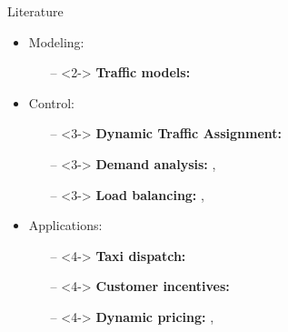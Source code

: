     \begin{frame}{Literature}
    \begin{itemize}
        \item<1->\alert{Modeling:}
            \begin{itemize}
                \item[--]<2-> \textbf{Traffic models:} \textcite{wardrop1900journey,treiber2000congested} \\
            \end{itemize}
        \item<1->\alert{Control:}
            \begin{itemize}
                \item[--]<3-> \textbf{Dynamic Traffic Assignment:} \textcite{friesz1989dynamic,merchant1978optimality,waller2013linear}
                \item[--]<3-> \textbf{Demand analysis:} \textcite{froehlich2008measuring,raviv2013static}, \textcite{schuijbroek2017inventory}
                \item[--]<3-> \textbf{Load balancing:} \textcite{pavone2012robotic}, \textcite{smith2013rebalancing}
            \end{itemize}
        \item<1->\alert{Applications:}
            \begin{itemize}
                \item[--]<4-> \textbf{Taxi dispatch:} \textcite{zhang2017taxi}
                \item[--]<4-> \textbf{Customer incentives:} \textcite{singla2015incentivizing}
                \item[--]<4-> \textbf{Dynamic pricing:} \textcite{castillo2017surge}, \textcite{banerjee2016dynamic}
            \end{itemize}
    \end{itemize}    
    \end{frame}